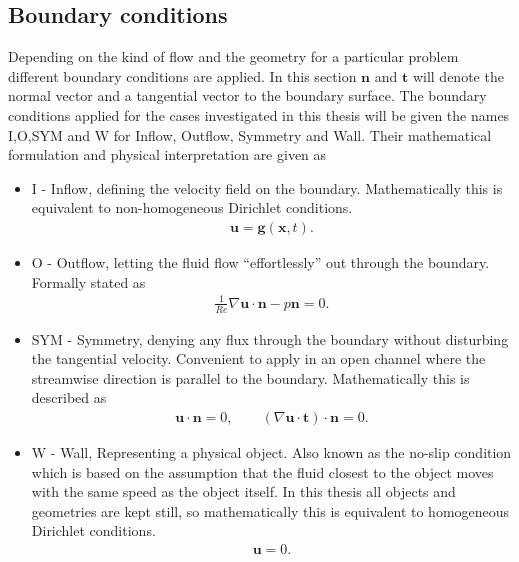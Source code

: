 \subsection{Boundary conditions}\label{BC}
Depending on the kind of flow and the geometry for a particular problem different boundary conditions are applied. In this section 
$\mathbf{n}$ and $\mathbf{t}$ will denote the normal vector and a tangential vector to the boundary surface.
The boundary conditions applied for the cases investigated in this thesis will be given the names 
I,O,SYM and W for Inflow, Outflow, Symmetry and Wall. Their mathematical formulation and physical interpretation are given as 
\begin{itemize}
    \item I 
        - Inflow, defining the velocity field on the boundary. Mathematically this is equivalent to 
        non-homogeneous Dirichlet conditions. 
        \begin{align}
            \mathbf{u} = \mathbf{g}(\mathbf{x},t).
        \end{align}
    \item O 
        - Outflow, letting the fluid flow ``effortlessly'' out through the boundary. Formally stated as
        \begin{align}
            \frac{1}{Re} \nabla\mathbf{u}\cdot \mathbf{n}-p\mathbf{n}= 0.
        \end{align}
    \item SYM 
        - Symmetry, denying any flux through the boundary without disturbing the tangential velocity. Convenient
        to apply in an open channel where the streamwise direction is parallel to the boundary. Mathematically this is 
        described as 
        \begin{align}
            \mathbf{u}\cdot \mathbf{n} = 0, \qquad (\nabla\mathbf{u}\cdot \mathbf{t})\cdot \mathbf{n} = 0.
        \end{align}
    \item W 
        - Wall, Representing a physical object. Also known as the no-slip condition which is based on the assumption 
        that the fluid closest to the object moves with the same speed as the object itself. In this thesis all objects and 
        geometries are kept still, so mathematically this is equivalent to 
        homogeneous Dirichlet conditions. 
        \begin{align}
            \mathbf{u} = 0.
        \end{align}

\end{itemize}
%
